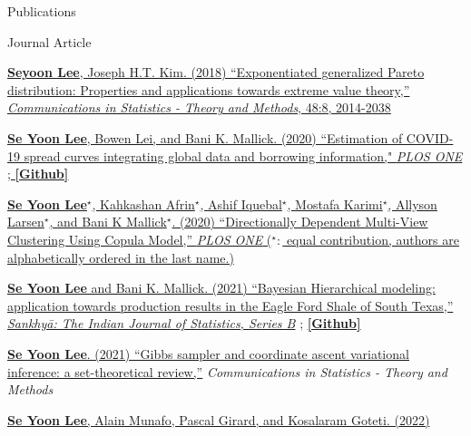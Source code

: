 \documentclass[
	11pt, %
]{resume} %
\begin{document}

\begin{rSection}{Publications}
\begin{rSubsection}{Journal Article}{}{}{}
\item[] [1] \href{https://www.tandfonline.com/doi/pdf/10.1080/03610926.2018.1441418?needAccess=true}
{\underline{\textbf{Seyoon Lee}}, Joseph H.T. Kim. (2018) ``Exponentiated generalized Pareto distribution:
Properties and applications towards extreme
value theory,''
\textit{Communications in Statistics - Theory and Methods},
 48:8, 2014-2038}
\item[] [2] \href{https://journals.plos.org/plosone/article?id=10.1371/journal.pone.0236860}
{\underline{\textbf{Se Yoon Lee}}, Bowen Lei, and Bani K. Mallick. (2020)
``Estimation of COVID-19 spread curves integrating global data and borrowing information," \textit{PLOS ONE}
;
\href{https://github.com/StevenBoys/BHRM}{\underline{\textbf{[Github]}}}
}
\item[] [3] 
\href{https://journals.plos.org/plosone/article?id=10.1371/journal.pone.0238996}
{\underline{\textbf{Se Yoon Lee}}$^\star$, Kahkashan Afrin$^\star$, Ashif Iquebal$^\star$, Mostafa Karimi$^\star$, Allyson Larsen$^\star$, and Bani K Mallick$^\star$. (2020)
``Directionally Dependent Multi-View Clustering Using Copula Model,'' \textit{PLOS ONE} ($^\star:$ equal contribution, authors are alphabetically ordered in the last name.)}
\item[] [4]
\href{https://rdcu.be/ceg4p}
{\underline{\textbf{Se Yoon Lee}} and Bani K. Mallick. (2021)
``Bayesian Hierarchical modeling: application towards
production results in the Eagle Ford Shale of South Texas,'' \textit{Sankhyā: The Indian Journal of Statistics, Series B}}
;
\href{https://github.com/yain22/SWM}{\underline{\textbf{[Github]}}}
\item[] [5]
\href{https://www.tandfonline.com/doi/full/10.1080/03610926.2021.1921214?src=}
{\underline{\textbf{Se Yoon Lee}}. (2021)
``Gibbs sampler and coordinate ascent variational inference: a set-theoretical review,''}
\textit{Communications in Statistics - Theory and Methods}
\item[][6]
\href{https://www.sciencedirect.com/science/article/pii/S1551714421003931}
{\underline{\textbf{Se Yoon Lee}}, Alain Munafo, Pascal Girard, and Kosalaram Goteti. (2022)
}
\end{rSubsection}
\end{rSection}
\end{document}
